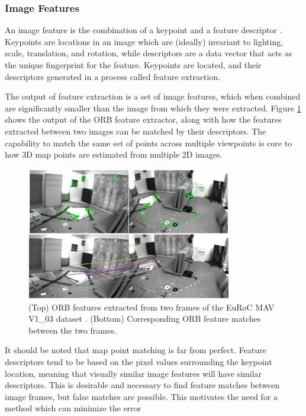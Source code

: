 \subsubsection{Image Features}

An image feature is the combination of a keypoint and a feature descriptor \cite{loweObjectRecognitionLocal1999}. Keypoints are locations in an image which are (ideally) invariant to lighting, scale, translation, and rotation\cite{shiGoodFeaturesTrack1994}, while descriptors are a data vector that acts as the unique fingerprint for the feature. Keypoints are located, and their descriptors generated in a process called feature extraction.

The output of feature extraction is a set of image features, which when combined are significantly smaller than the image from which they were extracted. Figure \ref{fig:feature_extraction_and_matching} shows the output of the ORB feature extractor, along with how the features extracted between two images can be matched by their descriptors. The capability to match the same set of points across multiple viewpoints is core to how 3D map points are estimated from multiple 2D images.

\begin{figure}[!ht]
    \centering
    \includegraphics[width=0.8\textwidth]{resources/feature_extraction_and_matching.png}
    \caption[Image Feature Extraction and Matching]{(Top) ORB features extracted from two frames of the EuRoC MAV V1\_03 dataset \cite{burriEuRoCMicroAerial2016}. (Bottom) Corresponding ORB feature matches between the two frames.}
    \label{fig:feature_extraction_and_matching}
\end{figure}

It should be noted that map point matching is far from perfect. Feature descriptors tend to be based on the pixel values surrounding the keypoint location, meaning that visually similar image features will have similar descriptors. This is desirable and necessary to find feature matches between image frames, but false matches are possible. This motivates the need for a method which can minimize the error

